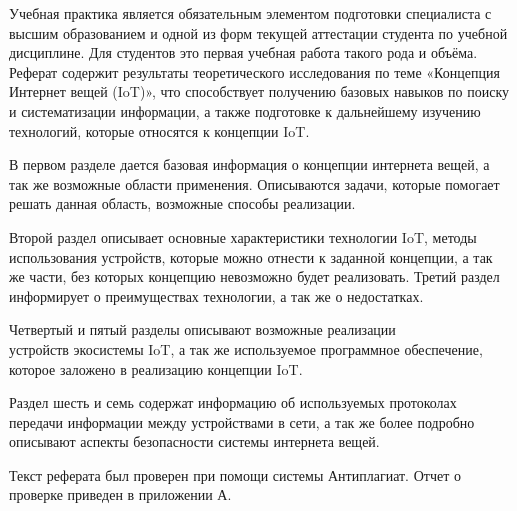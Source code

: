 Учебная практика является обязательным элементом подготовки специалиста с высшим образованием и одной из форм текущей аттестации студента по учебной дисциплине. Для студентов это первая учебная работа такого рода и объёма. Реферат содержит результаты теоретического исследования по теме «Концепция Интернет вещей (IoT)», что способствует получению базовых навыков по поиску и систематизации информации, а также подготовке к дальнейшему изучению технологий, которые относятся к концепции IoT.


В первом разделе дается базовая информация о концепции интернета вещей, а так же возможные области применения. Описываются задачи, которые помогает решать данная область, возможные способы реализации.


Второй раздел описывает основные характеристики технологии IoT, методы использования устройств, которые можно отнести к заданной концепции, а так же части, без которых концепцию невозможно будет реализовать. Третий раздел информирует о преимуществах технологии, а так же о недостатках. 


Четвертый и пятый разделы описывают возможные реализации \\
устройств экосистемы IoT, а так же используемое программное обеспечение, которое заложено в реализацию концепции IoT.


Раздел шесть и семь содержат информацию об используемых протоколах передачи информации между устройствами в сети, а так же более подробно описывают аспекты безопасности системы интернета вещей.


Текст реферата был проверен при помощи системы Антиплагиат. Отчет о проверке приведен в приложении А.